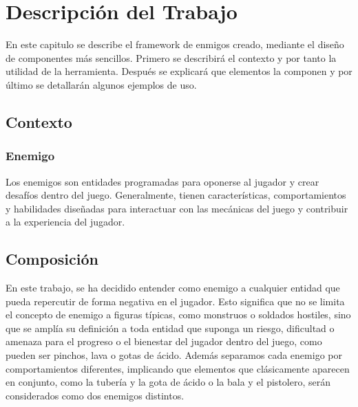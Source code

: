 \chapter{Descripción del Trabajo}
\label{cap:descripcionTrabajo}
En este capitulo se describe el framework de enmigos creado, mediante el diseño de componentes más sencillos. 
Primero se describirá el contexto y por tanto la utilidad de la herramienta. Después se explicará que elementos la componen y por último se detallarán algunos ejemplos de uso. \\
\section{Contexto}
\subsection{Enemigo}
Los enemigos son entidades programadas para oponerse al jugador y crear desafíos dentro del juego. Generalmente, tienen características, comportamientos y habilidades diseñadas para interactuar con las mecánicas del juego y contribuir a la experiencia del jugador. \\

\section{Composición}
En este trabajo, se ha decidido entender como enemigo a cualquier entidad que pueda repercutir de forma negativa en el jugador. Esto significa que no se limita el concepto de enemigo a figuras típicas, como monstruos o soldados hostiles, sino que se amplía su definición a toda entidad que suponga un riesgo, dificultad o amenaza para el progreso o el bienestar del jugador dentro del juego, como pueden ser pinchos, lava o gotas de ácido.
Además separamos cada enemigo por comportamientos diferentes, implicando que elementos que clásicamente aparecen en conjunto, como la tubería y la gota de ácido o la bala y el pistolero, serán considerados como  dos enemigos distintos.\\

